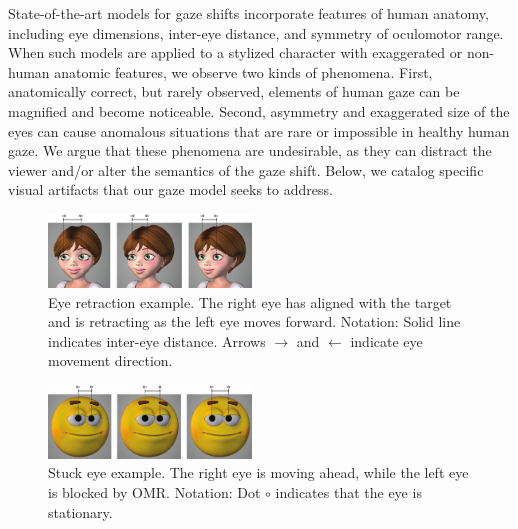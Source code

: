 State-of-the-art models for gaze shifts incorporate features of human anatomy, including eye dimensions, inter-eye distance, and symmetry of oculomotor range. When such models are applied to a stylized character with exaggerated or non-human anatomic features, we observe two kinds of phenomena. First, anatomically correct, but rarely observed, elements of human gaze can be magnified and become noticeable. Second, asymmetry and exaggerated size of the eyes can cause anomalous situations that are rare or impossible in healthy human gaze. We argue that these phenomena are undesirable, as they can distract the viewer and/or alter the semantics of the gaze shift. Below, we catalog specific visual artifacts that our gaze model seeks to address. 

\begin{figure}[!b]
\centering
\vspace{-6pt}
\includegraphics[width=0.48\textwidth]{Figures/EyeRetractionExample-small.pdf}
\caption{Eye retraction example. The right eye has aligned with the target and is retracting as the left eye moves forward. Notation: Solid line indicates inter-eye distance. Arrows $\rightarrow$ and $\leftarrow$ indicate eye movement direction.}
\vspace{-6pt}
\label{fig:EyeRetractionExample}
\end{figure}

\begin{figure}[t]
\centering
\includegraphics[width=0.48\textwidth]{Figures/StuckEyeExample-small.pdf}
\caption{Stuck eye example. The right eye is moving ahead, while the left eye is blocked by OMR. Notation: Dot $\circ$ indicates that the eye is stationary.}
\vspace{-10pt}
\label{fig:StuckEyeExample}
\end{figure}

